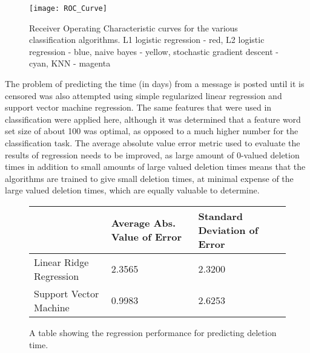 \documentclass{article} %
\begin{document}
\begin{CJK*}{UTF8}{gbsn}
\begin{figure}[!htb]
	\begin{center}
	\texttt{[image: ROC\_Curve]}
	\end{center}
\caption{Receiver Operating Characteristic curves for the various classification algorithms. L1 logistic regression - red, L2 logistic regression - blue, naive bayes - yellow, stochastic gradient descent - cyan, KNN - magenta}
\vspace{-10pt}
\end{figure}

The problem of predicting the time (in days) from a message is posted until it is censored was also attempted using simple regularized linear regression and support vector machine regression. The same features that were used in classification were applied here, although it was determined that a feature word set size of about 100 was optimal, as opposed to a much higher number for the classification task. The average absolute value error metric used to evaluate the results of regression needs to be improved, as large amount of 0-valued deletion times in addition to small amounts of large valued deletion times means that the algorithms are trained to give small deletion times, at minimal expense of the large valued deletion times, which are equally valuable to determine. 

\begin{figure}[!htb]
	\begin{center}
		    \begin{tabular}{ |l | l | l |}
		    \hline
		    & Average Abs. Value of Error & Standard Deviation of Error \\\hline
		    Linear Ridge Regression & 2.3565 & 2.3200 \\\hline
		    Support Vector Machine & 0.9983 & 2.6253 \\ \hline
		    \end{tabular}
	\end{center}
\caption{A table showing the regression performance for predicting deletion time.}
\vspace{-10pt}
\end{figure}


\end{CJK*}
\end{document}
